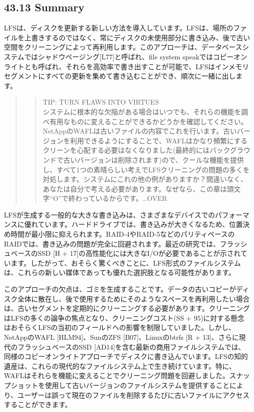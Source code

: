 \hypertarget{summary-30}{%
\subsection*{43.13 Summary}\label{summary-30}}

LFSは、ディスクを更新する新しい方法を導入しています。LFSは、場所のファイルを上書きするのではなく、常にディスクの未使用部分に書き込み、後で古い空間をクリーニングによって再利用します。このアプローチは、データベースシステムではシャドウページング{[}L77{]}と呼ばれ、file
system
speakではコピーオンライトとも呼ばれ、それらを高効率で書き出すことが可能で、LFSはインメモリセグメントにすべての更新を集めて書き込むことができ、順次に一緒に出します。

\begin{quote}
\begin{quote}
TIP: TURN FLAWS INTO VIRTUES\\
システムに根本的な欠陥がある場合はいつでも、それらの機能を調べ有用なものに変えることができるかどうかを確認してください。NetAppのWAFLは古いファイルの内容でこれを行います。古いバージョンを利用できるようにすることで、WAFLはかなり頻繁にするクリーンを心配する必要はなくなりました(最終的にはバックグラウンドで古いバージョンは削除されます)ので、クールな機能を提供し、すべて1つの素晴らしい考えでLFSクリーニングの問題の多くを対処します。システムにこれの他の例がありますか？間違いなく、あなたは自分で考える必要があります。なぜなら、この章は頭文字``O''で終わっているからです。\ldots OVER
\end{quote}
\end{quote}

LFSが生成する一般的な大きな書き込みは、さまざまなデバイスでのパフォーマンスに優れています。ハードドライブでは、書き込みが大きくなるため、位置決め時間が最小限に抑えられます。RAID-4やRAID-5などのパリティベースのRAIDでは、書き込みの問題が完全に回避されます。最近の研究では、フラッシュベースのSSD
{[}H +
17{]}の高性能化には大きなI/Oが必要であることが示されています。したがって、おそらく驚くべきことに、LFS形式のファイルシステムは、これらの新しい媒体であっても優れた選択肢となる可能性があります。

このアプローチの欠点は、ゴミを生成することです。データの古いコピーがディスク全体に散在し、後で使用するためにそのようなスペースを再利用したい場合は、古いセグメントを定期的にクリーニングする必要があります。クリーニングはLFSの多くの論争の焦点となり、クリーニングコスト(SS
+
95)に対する懸念はおそらくLFSの当初のフィールドへの影響を制限していました。しかし、NetAppのWAFL
{[}HLM94{]}、SunのZFS {[}B07{]}、Linuxのbtrfs {[}R +
13{]}、さらに現代のフラッシュベースのSSD
{[}AD14{]}を含む最新の商用ファイルシステムでは、同様のコピーオンライトアプローチでディスクに書き込んでいます。LFSの知的遺産は、これらの現代的なファイルシステム上で生き続けています。特に、WAFLはそれらを機能に変えることでクリーニング問題を回避しました。スナップショットを使用して古いバージョンのファイルシステムを提供することにより、ユーザーは誤って現在のファイルを削除するたびに古いファイルにアクセスすることができます。

